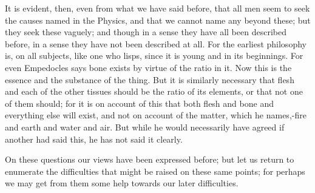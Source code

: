 \documentclass{article}
\begin{document}
It is evident, then, even from what we have said before, that all men seem to seek the causes named in the Physics, and that we cannot name any beyond these; but they seek these vaguely; and though in a sense they have all been described before, in a sense they have not been described at all. For the earliest philosophy is, on all subjects, like one who lisps, since it is young and in its beginnings. For even Empedocles says bone exists by virtue of the ratio in it. Now this is the essence and the substance of the thing. But it is similarly necessary that flesh and each of the other tissues should be the ratio of its elements, or that not one of them should; for it is on account of this that both flesh and bone and everything else will exist, and not on account of the matter, which he names,-fire and earth and water and air. But while he would necessarily have agreed if another had said this, he has not said it clearly.

On these questions our views have been expressed before; but let us return to enumerate the difficulties that might be raised on these same points; for perhaps we may get from them some help towards our later difficulties.
\end{document}
